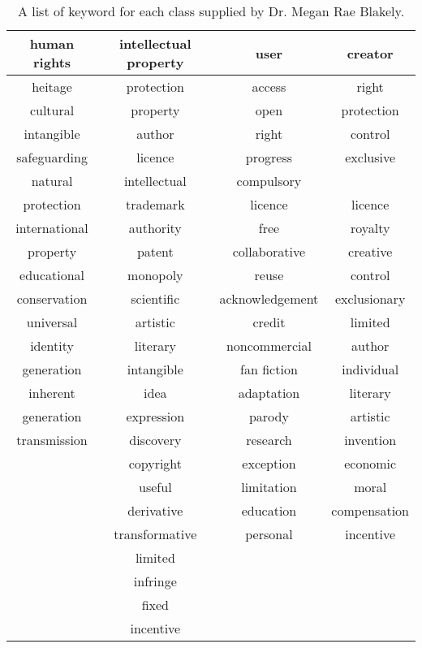 		\begin{table}[h]
			\centering
			\begin{tabular}{c|c|c|c}
				\hline
				human rights&intellectual property&user&creator\\
				\hline
				heitage&protection&access&right\\
				cultural&property&open&protection\\
				intangible&author&right&control\\
				safeguarding&licence&progress&exclusive\\
				natural&intellectual&compulsory&\\
				protection&trademark&licence&licence\\
				international&authority&free&royalty\\
				property&patent&collaborative&creative\\
				educational&monopoly&reuse&control\\
				conservation&scientific&acknowledgement&exclusionary\\
				universal&artistic&credit&limited\\
				identity&literary&noncommercial&author\\
				generation&intangible&fan fiction&individual\\
				inherent&idea&adaptation&literary\\
				generation&expression&parody&artistic\\
				transmission&discovery&research&invention\\
				&copyright&exception&economic\\
				&useful&limitation&moral\\
				&derivative&education&compensation\\
				&transformative&personal&incentive\\
				&limited&&\\
				&infringe&&\\
				&fixed&&\\
				&incentive&&\\
			\end{tabular}
			\caption{A list of keyword for each class supplied by Dr. Megan Rae Blakely.}\label{tab:keyword-list}
		\end{table}
